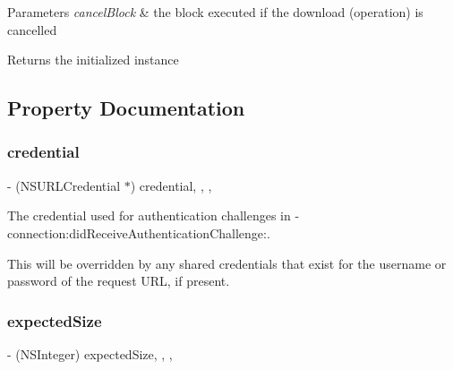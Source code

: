 \begin{DoxyParams}{Parameters}
{\em cancel\+Block} & the block executed if the download (operation) is cancelled\\
\hline
\end{DoxyParams}
\begin{DoxyReturn}{Returns}
the initialized instance 
\end{DoxyReturn}


\subsection{Property Documentation}
\mbox{\label{interface_s_d_web_image_downloader_operation_a940c40dd676fe65d7d694499eb901c43}} 
\subsubsection{\texorpdfstring{credential}{credential}}
{\footnotesize\ttfamily -\/ (N\+S\+U\+R\+L\+Credential $\ast$) credential\hspace{0.3cm}{\ttfamily [read]}, {\ttfamily [write]}, {\ttfamily [nonatomic]}, {\ttfamily [strong]}}

The credential used for authentication challenges in {\ttfamily -\/connection\+:did\+Receive\+Authentication\+Challenge\+:}.

This will be overridden by any shared credentials that exist for the username or password of the request U\+RL, if present. \mbox{\label{interface_s_d_web_image_downloader_operation_ace822ba63156e817ce6f6671c7c67880}} 
\subsubsection{\texorpdfstring{expected\+Size}{expectedSize}}
{\footnotesize\ttfamily -\/ (N\+S\+Integer) expected\+Size\hspace{0.3cm}{\ttfamily [read]}, {\ttfamily [write]}, {\ttfamily [nonatomic]}, {\ttfamily [assign]}}

